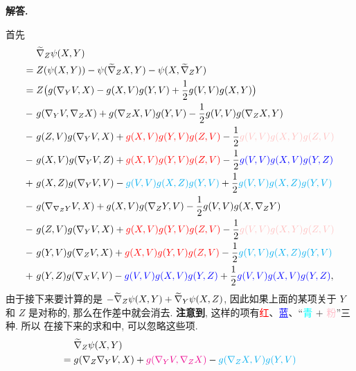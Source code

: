 \documentclass{ctexart}
\newenvironment{solution}{\par\noindent\textbf{解答. }}{\par}
\newcommand{\cred}{\textcolor{red}}
\newcommand{\cblue}{\textcolor{blue}}
\newcommand{\ccyan}{\textcolor{cyan}}
\newcommand{\cmag}{\textcolor{magenta}}
\newcommand{\cpink}{\textcolor{pink}}
\begin{document}
\begin{solution}
\begin{enumerate}
        首先
        \[
            \begin{aligned}
                 {  } & \tDiv{Z}\psi(X, Y) \\
                ={  } & Z(\psi(X, Y)) - \psi(\tDiv{Z}X, Y) - \psi(X, \tDiv{Z}Y) \\
                ={  } & Z\bigl(g(\Div{Y}V, X) - g(X, V)g(Y, V) + \dfrac{1}{2}g(V, V)g(X, Y)\bigr) \\
                -{\ } & g(\Div{Y}V, \Div{Z}X) + g(\Div{Z}X, V)g(Y, V) - \dfrac{1}{2}g(V, V)g(\Div{Z}{X}, Y) \\
                -{\ } & g(Z, V)g(\Div{Y}V, X) + \cred{g(X, V)g(Y, V)g(Z, V)} - \dfrac{1}{2}\cpink{g(V, V)g(X, Y)g(Z, V)} \\
                -{\ } & {g(X, V)g(\Div{Y}V, Z)} + \cred{g(X, V)g(Y, V)g(Z, V)} - \dfrac{1}{2}\cblue{g(V, V)g(X, V)g(Y, Z)} \\
                +{\ } & g(X, Z)g(\Div{Y}V, V) - \ccyan{g(V, V)g(X, Z)g(Y, V)} + \dfrac{1}{2}\ccyan{g(V, V)g(X, Z)g(Y, V)} \\
                -{\ } & g(\Div{\Div{Z}Y}V, X) + g(X, V)g(\Div{Z}Y, V) - \dfrac{1}{2}g(V, V)g(X, \Div{Z}Y) \\
                -{\ } & g(Z, V)g(\Div{Y}V, X) + \cred{g(X, V)g(Y, V)g(Z, V)} - \dfrac{1}{2}\cpink{g(V, V)g(X, Y)g(Z, V)} \\
                -{\ } & g(Y, V)g(\Div{Z}V, X) + \cred{g(X, V)g(Y, V)g(Z, V)} - \dfrac{1}{2}\ccyan{g(V, V)g(X, Z)g(Y, V)} \\
                +{\ } & g(Y, Z)g(\Div{X}V, V) - \cblue{g(V, V)g(X, V)g(Y, Z)} + \dfrac{1}{2}\cblue{g(V, V)g(X, V)g(Y, Z)},
            \end{aligned}
        \]
        由于接下来要计算的是 $-\widetilde{\nabla}_{Z}\psi(X, Y) + \widetilde{\nabla}_{Y}\psi(X, Z)$, 因此如果上面的某项关于 $Y$ 和 $Z$ 是对称的, 那么在作差中就会消去. \textbf{注意到}, 这样的项有\cred{红}、\cblue{蓝}、``\ccyan{青} $+$ \cpink{粉}''三种. 所以 在接下来的求和中, 可以忽略这些项.
        \[
            \begin{aligned}
                {  } & \tDiv{Z}\psi(X, Y) \\
               ={  } & g(\Div{Z}\Div{Y}V, X) + \cmag{g(\Div{Y}V, \Div{Z}X)} - \ccyan{g(\Div{Z}X, V)g(Y, V)} \\

\end{aligned}\]
\end{enumerate}
\end{solution}
\end{document}
